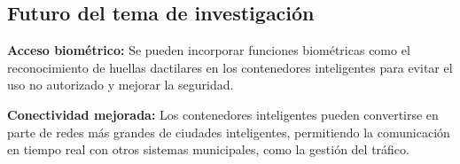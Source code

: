 \subsection{Futuro del tema de investigación}

\textbf{Acceso biométrico:} Se pueden incorporar funciones biométricas como el reconocimiento de huellas dactilares en los contenedores inteligentes para evitar el uso no autorizado y mejorar la seguridad.

\textbf{Conectividad mejorada:} Los contenedores inteligentes pueden convertirse en parte de redes más grandes de ciudades inteligentes, permitiendo la comunicación en tiempo real con otros sistemas municipales, como la gestión del tráfico.
